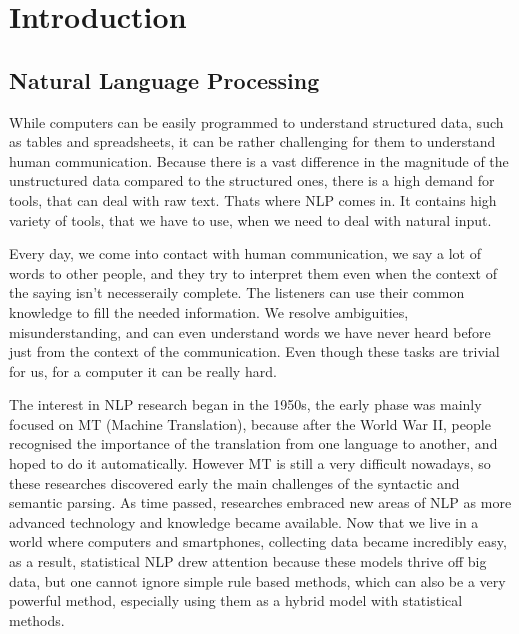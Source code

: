 \chapter*{Introduction}
\section{Natural Language Processing}
While computers can be easily programmed to understand structured data, such as tables and spreadsheets, it can be rather challenging for them
to understand human communication. Because there is a vast difference in the magnitude of the unstructured data compared to the structured ones, there is a high demand
for tools, that can deal with raw text. Thats where NLP comes in. It contains high variety of tools, that we have to use, when we need to deal with natural input.

Every day, we come into contact with human communication, we say a lot of words to other people, and they try to interpret them even when the context of the saying 
isn't necesseraily complete. The listeners can use their common knowledge to fill the needed information. We resolve ambiguities, misunderstanding, and can even understand words 
we have never heard before just from the context of the communication.
Even though these tasks are trivial for us, for a computer it can be really hard.

The interest in NLP research began in the 1950s, the early phase was mainly focused on MT (Machine Translation), because after the World War II, people
recognised the importance of the translation from one language to another, and hoped to do it automatically.
However MT is still a very difficult nowadays, so these researches discovered early the main challenges of the syntactic and semantic parsing.
As time passed, researches embraced new areas of NLP as more advanced technology and knowledge became available. Now that we live in a world where
computers and smartphones, collecting data became incredibly easy, as a result, statistical NLP drew attention because these models thrive off big data, but one cannot ignore 
simple rule based methods, which can also be a very powerful method, especially using them as a hybrid model with statistical methods.

